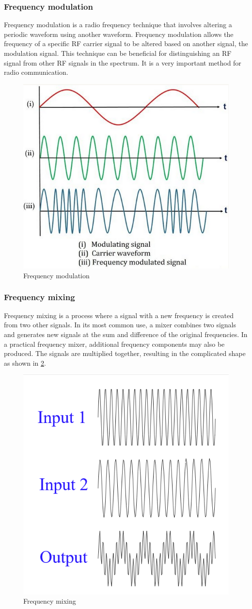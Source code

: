 \documentclass{article}
\begin{document}
\subsubsection{Frequency modulation}
Frequency modulation is a radio frequency technique that involves altering a periodic waveform using another waveform. Frequency modulation allows the frequency of a specific RF carrier signal to be altered based on another signal, the modulation signal. This technique can be beneficial for distinguishing an RF signal from other RF signals in the spectrum. It is a very important method for radio communication. 
\begin{figure}[h]
    \centering
    \includegraphics[width=0.5\linewidth]{Figures/Intro/3.png}
    \caption{Frequency modulation \cite{waveform}}
    \label{fig:frequency_modulation}
\end{figure}

\pagebreak{}

\subsubsection{Frequency mixing}
Frequency mixing is a process where a signal with a new frequency is created from two other signals. In its most common use, a mixer combines two signals and generates new signals at the sum and difference of the original frequencies. In a practical frequency mixer, additional frequency components may also be produced. The signals are multiplied together, resulting in the complicated shape as shown in \ref{fig:frequency_mixing}. 

\begin{figure}[h]
    \centering
    \includegraphics[width=0.5\linewidth]{Figures/Intro/4.png}
    \caption{Frequency mixing \cite{understand}}
    \label{fig:frequency_mixing}
\end{figure}
\end{document}
